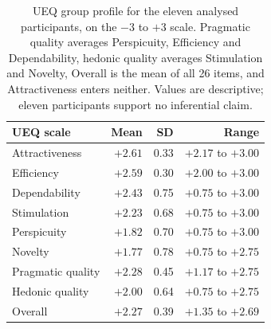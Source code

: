 \begin{table}[htpb]
    \centering
    \small
    \begin{tabular}{lrrr}
        \toprule
        UEQ scale & Mean & SD & Range \\
        \midrule
        Attractiveness & $+2.61$ & 0.33 & $+2.17$ to $+3.00$ \\
        Efficiency     & $+2.59$ & 0.30 & $+2.00$ to $+3.00$ \\
        Dependability  & $+2.43$ & 0.75 & $+0.75$ to $+3.00$ \\
        Stimulation    & $+2.23$ & 0.68 & $+0.75$ to $+3.00$ \\
        Perspicuity    & $+1.82$ & 0.70 & $+0.75$ to $+3.00$ \\
        Novelty        & $+1.77$ & 0.78 & $+0.75$ to $+2.75$ \\
        \midrule
        Pragmatic quality & $+2.28$ & 0.45 & $+1.17$ to $+2.75$ \\
        Hedonic quality   & $+2.00$ & 0.64 & $+0.75$ to $+2.75$ \\
        Overall           & $+2.27$ & 0.39 & $+1.35$ to $+2.69$ \\
        \bottomrule
    \end{tabular}
    \caption{UEQ group profile for the eleven analysed participants, on the $-3$ to $+3$ scale. Pragmatic quality averages Perspicuity, Efficiency and Dependability, hedonic quality averages Stimulation and Novelty, Overall is the mean of all 26 items, and Attractiveness enters neither. Values are descriptive; eleven participants support no inferential claim.}
    \label{tab:ueq}
\end{table}

